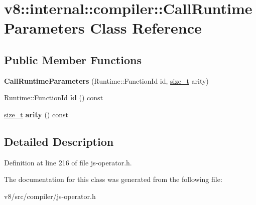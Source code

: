 \hypertarget{classv8_1_1internal_1_1compiler_1_1CallRuntimeParameters}{}\section{v8\+:\+:internal\+:\+:compiler\+:\+:Call\+Runtime\+Parameters Class Reference}
\label{classv8_1_1internal_1_1compiler_1_1CallRuntimeParameters}
\subsection*{Public Member Functions}
\begin{DoxyCompactItemize}
\item 
\mbox{\label{classv8_1_1internal_1_1compiler_1_1CallRuntimeParameters_a9fe116c73bb5e6bb8e944e494335cd8e}} 
{\bfseries Call\+Runtime\+Parameters} (Runtime\+::\+Function\+Id id, \mbox{\hyperlink{classsize__t}{size\+\_\+t}} arity)
\item 
\mbox{\label{classv8_1_1internal_1_1compiler_1_1CallRuntimeParameters_aa3badaa1cea1f0be6fa5f249c755f534}} 
Runtime\+::\+Function\+Id {\bfseries id} () const
\item 
\mbox{\label{classv8_1_1internal_1_1compiler_1_1CallRuntimeParameters_a51840b7215ab30e8fc89c877be3f89b1}} 
\mbox{\hyperlink{classsize__t}{size\+\_\+t}} {\bfseries arity} () const
\end{DoxyCompactItemize}


\subsection{Detailed Description}


Definition at line 216 of file js-\/operator.\+h.



The documentation for this class was generated from the following file\+:\begin{DoxyCompactItemize}
\item 
v8/src/compiler/js-\/operator.\+h\end{DoxyCompactItemize}
